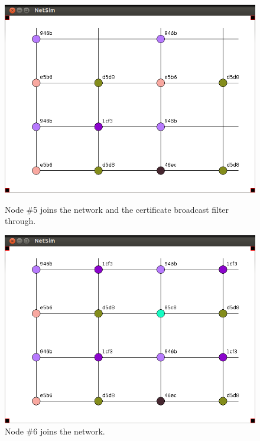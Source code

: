 \documentclass[ %
                    author={Luke Murray},
                supervisor={Dr. Simon Hollis},
                     title={Shadow Peer-to-Peer Networks},
                  subtitle={},
                    degree={MEng},
                      year={2013} ]{thesis}
\begin{document}
\begin{figure}[h]
    \centering
    \begin{minipage}[b]{0.45\linewidth}
        \centering
        \includegraphics[width=\linewidth]{sim_pics/expand_7.png}
        \caption{Node \#5 joins the network and the certificate broadcast filter through.}
        \label{sim_expand7}
    \end{minipage}
    \hspace{0.5cm}
    \begin{minipage}[b]{0.45\linewidth}
        \centering
        \includegraphics[width=\linewidth]{sim_pics/expand_8.png}
        \caption{Node \#6 joins the network.}
        \label{sim_expand8}
    \end{minipage}
\end{figure}
\end{document}
